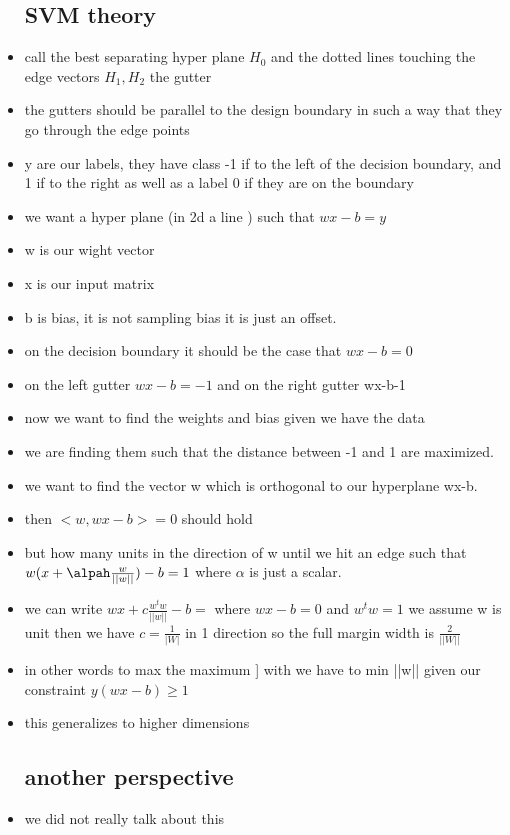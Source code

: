 \documentclass{article}
\begin{document}
\begin{itemize}
\subsection{SVM theory }
\item call the best separating hyper plane $H_0$ and the dotted lines touching the edge vectors $H_1, H_2$ the gutter
\item the gutters should be parallel to the design boundary in such a  way that they go through the edge points 
\item y are our labels, they have class -1 if to the left of the decision boundary, and 1 if to the right as well as a label 0 if they are on the boundary
\item we want a hyper plane (in 2d a line ) such that $wx-b=y$ 
\item w is our wight vector 
\item x is our input matrix
\item b is bias, it is not sampling bias it is just an offset.
\item on the decision boundary it should be the case that $wx-b=0$ 
\item on the left gutter $wx-b=-1$ and on the right gutter wx-b-1
\item now we want to find the weights and bias given we have the data 
\item we are finding them such that the distance between -1 and 1 are maximized.
\item we want to find the vector w which is orthogonal to our hyperplane wx-b. 
\item then $<w,wx-b>=0$ should hold 
\item but how many units in the direction of w until we hit an edge such that $w(x+\alpah \frac{w}{||w||})-b=1$ where $\alpha$ is just a scalar. 
\item we can write $wx+c\frac{w^tw}{||w||}-b=$ where $wx-b=0$ and $w^tw=1$ we assume w is unit \itme then we have $c=\frac{1}{|W|}$ in 1 direction so the full margin width is $\frac{2}{||W||}$ 
\item in other words to max the maximum ] with we have to min ||w|| given our constraint $y(wx-b)\geq 1$ 
\item this generalizes to higher dimensions 
\subsection{another perspective}
\item we did not really talk about this

\end{itemize}
\end{document}
